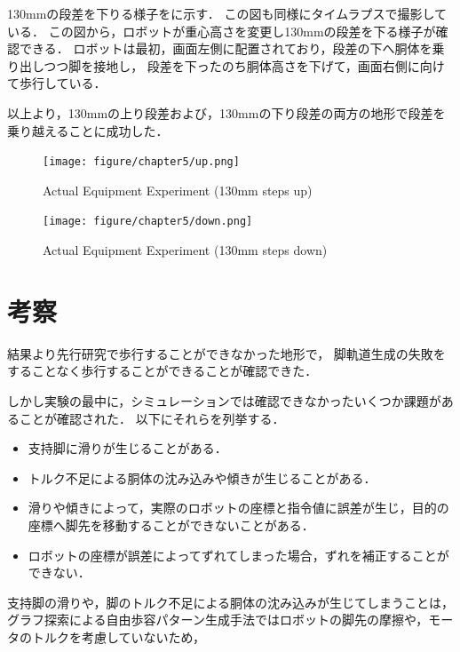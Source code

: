 130mmの段差を下りる様子をに示す．
この図も同様にタイムラプスで撮影している．
この図から，ロボットが重心高さを変更し130mmの段差を下る様子が確認できる．
ロボットは最初，画面左側に配置されており，段差の下へ胴体を乗り出しつつ脚を接地し，
段差を下ったのち胴体高さを下げて，画面右側に向けて歩行している．

以上より，130mmの上り段差および，130mmの下り段差の両方の地形で段差を乗り越えることに成功した．

\newpage

\begin{figure}[tb]
  \centering
  \texttt{[image: figure/chapter5/up.png]}
  \caption{Actual Equipment Experiment (130mm steps up)}
  \label{fig:ch5_experiment_1}  %
\end{figure}

\begin{figure}[tb]
  \centering
  \texttt{[image: figure/chapter5/down.png]}
  \caption{Actual Equipment Experiment (130mm steps down)}
  \label{fig:ch5_experiment_2}  %
\end{figure}

\section{考察}
結果より先行研究で歩行することができなかった地形で，
脚軌道生成の失敗をすることなく歩行することができることが確認できた．

しかし実験の最中に，シミュレーションでは確認できなかったいくつか課題があることが確認された．
以下にそれらを列挙する．

\begin{itemize}
  \item 支持脚に滑りが生じることがある．
  \item トルク不足による胴体の沈み込みや傾きが生じることがある．
  \item 滑りや傾きによって，実際のロボットの座標と指令値に誤差が生じ，目的の座標へ脚先を移動することができないことがある．
  \item ロボットの座標が誤差によってずれてしまった場合，ずれを補正することができない．
\end{itemize}

支持脚の滑りや，脚のトルク不足による胴体の沈み込みが生じてしまうことは，
グラフ探索による自由歩容パターン生成手法ではロボットの脚先の摩擦や，モータのトルクを考慮していないため，